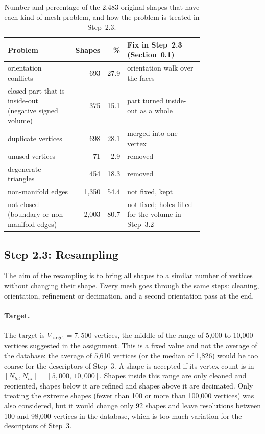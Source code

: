 \documentclass[10pt,a4paper]{article}
\begin{document}
\begin{table}[htbp]\centering\small
\begin{tabular}{@{}p{0.36\linewidth}rrp{0.40\linewidth}@{}}\toprule
Problem & Shapes & \% & Fix in Step~2.3 (Section~\ref{sec:resampling})\\\midrule
orientation conflicts & 693 & 27.9 & orientation walk over the faces\\
closed part that is inside-out (negative signed volume) & 375 & 15.1 & part turned inside-out as a whole\\
duplicate vertices & 698 & 28.1 & merged into one vertex\\
unused vertices & 71 & 2.9 & removed\\
degenerate triangles & 454 & 18.3 & removed\\
non-manifold edges & 1,350 & 54.4 & not fixed, kept\\
not closed (boundary or non-manifold edges) & 2,003 & 80.7 & not fixed; holes filled for the volume in Step~3.2\\
\bottomrule\end{tabular}
\caption{Number and percentage of the 2,483 original shapes that have each kind of mesh problem, and how the problem is
treated in Step~2.3.}\label{tab:s22quality}
\end{table}

\subsection{Step 2.3: Resampling}\label{sec:resampling}
The aim of the resampling is to bring all shapes to a similar number of vertices without changing their shape. Every mesh goes
through the same steps: cleaning, orientation, refinement or decimation, and a second orientation pass at the end.

\paragraph{Target.} The target is $V_{\text{target}}=7{,}500$ vertices, the middle of the range of 5,000 to 10,000 vertices
suggested in the assignment. This is a fixed value and not the average of the database: the average of 5,610 vertices (or the
median of 1,826) would be too coarse for the descriptors of Step~3. A shape is accepted if its vertex count is in $[N_{lo},N_{hi}]=[5{,}000,\,10{,}000]$. Shapes
inside this range are only cleaned and reoriented, shapes below it are refined and shapes above it are decimated. Only treating
the extreme shapes (fewer than 100 or more than 100,000 vertices) was also considered, but it would change only 92 shapes and
leave resolutions between 100 and 98,000 vertices in the database, which is too much variation for the descriptors of Step~3.
\end{document}
